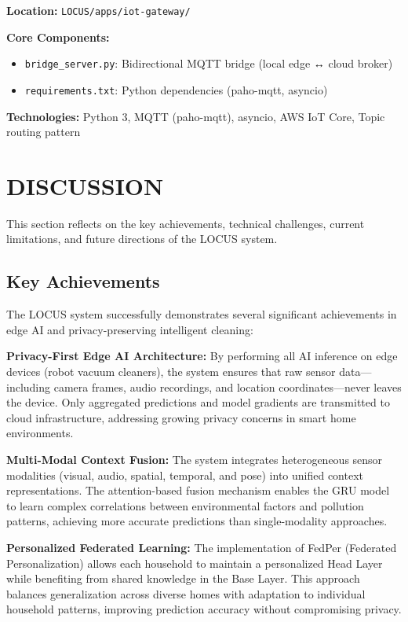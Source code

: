 \documentclass[conference]{IEEEtran}
\begin{document}
\textbf{Location:} \texttt{LOCUS/apps/iot-gateway/}

\textbf{Core Components:}
\begin{itemize}
    \item \texttt{bridge\_server.py}: Bidirectional MQTT bridge (local edge ↔ cloud broker)
    \item \texttt{requirements.txt}: Python dependencies (paho-mqtt, asyncio)
\end{itemize}

\textbf{Technologies:} Python 3, MQTT (paho-mqtt), asyncio, AWS IoT Core, Topic routing pattern

\section{DISCUSSION}

This section reflects on the key achievements, technical challenges, current limitations, and future directions of the LOCUS system.

\subsection{Key Achievements}

The LOCUS system successfully demonstrates several significant achievements in edge AI and privacy-preserving intelligent cleaning:

\textbf{Privacy-First Edge AI Architecture:} By performing all AI inference on edge devices (robot vacuum cleaners), the system ensures that raw sensor data—including camera frames, audio recordings, and location coordinates—never leaves the device. Only aggregated predictions and model gradients are transmitted to cloud infrastructure, addressing growing privacy concerns in smart home environments.

\textbf{Multi-Modal Context Fusion:} The system integrates heterogeneous sensor modalities (visual, audio, spatial, temporal, and pose) into unified context representations. The attention-based fusion mechanism enables the GRU model to learn complex correlations between environmental factors and pollution patterns, achieving more accurate predictions than single-modality approaches.

\textbf{Personalized Federated Learning:} The implementation of FedPer (Federated Personalization) allows each household to maintain a personalized Head Layer while benefiting from shared knowledge in the Base Layer. This approach balances generalization across diverse homes with adaptation to individual household patterns, improving prediction accuracy without compromising privacy.
\end{document}
